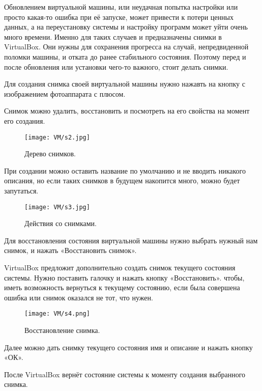 Обновлением виртуальной машины, или неудачная попытка настройки или просто какая-то ошибка при её запуске, может привести к потери ценных данных, а на переустановку системы и настройку программ может уйти очень много времени. Именно для таких случаев и предназначены снимки в VirtualBox. Они нужны для сохранения прогресса на случай, непредвиденной поломки машины, и отката до ранее стабильного состояния. Поэтому перед и после обновления или установки чего-то важного, стоит делать снимки.

Для создания снимка своей виртуальной машины нужно нажавть на кнопку с изображением фотоаппарата с плюсом.

Снимок можно удалить, восстановить и посмотреть на его свойства на момент его создания.

\begin{figure}[h]
		\centering
		\texttt{[image: VM/s2.jpg]}
\caption{Дерево снимков.}
\label{ris:image}
\end{figure}

При создании можно оставить название по умолчанию и не вводить никакого описания, но если таких снимков в будущем накопится много, можно будет запутаться. 

\begin{figure}[h]
		\centering
		\texttt{[image: VM/s3.jpg]}
\caption{Действия со снимками.}
\label{ris:image}
\end{figure}

Для восстановления состояния виртуальной машины нужно выбрать нужный нам снимок, и нажать «Восстановить снимок».
 
VirtualBox предложит дополнительно создать снимок текущего состояния системы. Нужно поставить галочку и нажать кнопку «Восстановить». чтобы, иметь возможность вернуться к  текущему состоянию, если была совершена ошибка или снимок оказался не тот, что нужен.
 
\begin{figure}[h]
		\centering
		\texttt{[image: VM/s4.png]}
\caption{Восстановление снимка.}
\label{ris:image}
\end{figure}

Далее можно дать снимку текущего состояния имя и описание и нажать кнопку «ОК».

После VirtualBox вернёт состояние системы к моменту создания выбранного снимка.

